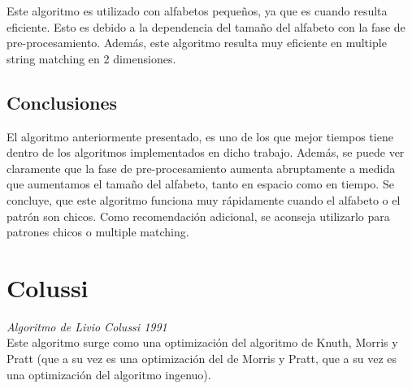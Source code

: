 \documentclass[a4paper, 10pt]{article}
\newcommand\tab[1][0.5cm]{\hspace*{#1}}
\begin{document}
		Este algoritmo es utilizado con alfabetos pequeños, ya que es cuando resulta eficiente. Esto es debido a la dependencia del tamaño del alfabeto con la fase de pre-procesamiento. Además, este algoritmo resulta muy eficiente en multiple string matching en 2 dimensiones.
		
		\subsection{Conclusiones}
		
		El algoritmo anteriormente presentado, es uno de los que mejor tiempos tiene dentro de los algoritmos implementados en dicho trabajo. Además, se puede ver claramente que la fase de pre-procesamiento aumenta abruptamente a medida que aumentamos el tamaño del alfabeto, tanto en espacio como en tiempo. Se concluye, que este algoritmo funciona muy rápidamente cuando el alfabeto o el patrón son chicos.
Como recomendación adicional, se aconseja utilizarlo para patrones chicos o multiple matching. 

	\section{Colussi}
		
		\emph{Algoritmo de Livio Colussi 1991} \\
		
		\tab Este algoritmo surge como una optimización del algoritmo de Knuth, Morris y Pratt (que a su vez es una
   		optimización del de Morris y Pratt, que a su vez es una optimización del algoritmo ingenuo).
		
\end{document}
